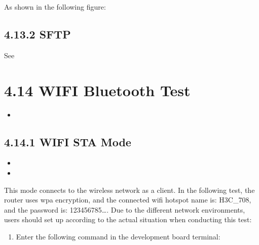 \documentclass[letterpaper,10pt,openany,english]{sphinxmanual}
\begin{document}
\sphinxAtStartPar
As shown in the following figure:


\subsection{4.13.2 SFTP}
\label{\detokenize{linux-manual:sftp}}
\sphinxAtStartPar
See {\hyperref[\detokenize{linux-manual:../02__E5_BF_AB_E9_80_9F_E5_BC_80_E6_9C_BA_E5_90_AF_E5_8A_A8/02__E5_BF_AB_E9_80_9F_E5_BC_80_E6_9C_BA_E5_90_AF_E5_8A_A8.md:chapter2_2.3.2}]{}}


\section{4.14 WIFI Bluetooth Test}
\label{\detokenize{linux-manual:wifi-bluetooth-test}}
\sphinxAtStartPar
{}
\begin{itemize}
\item {} 
\sphinxAtStartPar
{}

\end{itemize}


\subsection{4.14.1 WIFI STA Mode}
\label{\detokenize{linux-manual:wifi-sta-mode}}
\sphinxAtStartPar
{}
\begin{itemize}
\item {} 
\sphinxAtStartPar
{}

\item {} 
\sphinxAtStartPar
{}

\end{itemize}

\sphinxAtStartPar
This mode connects to the wireless network as a client. In the following test, the router uses wpa encryption, and the connected wifi hotspot name is: H3C\_708, and the password is: 123456785…. Due to the different network environments, users should set up according to the actual situation when conducting this test:
\begin{enumerate}
%
\item {} 
\sphinxAtStartPar
Enter the following command in the development board terminal:

\end{enumerate}
\end{document}
